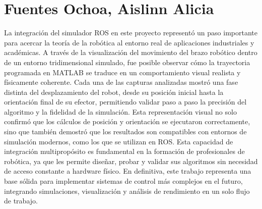 \section{Fuentes Ochoa, Aislinn Alicia}
La integración del simulador ROS en este proyecto representó un paso importante para acercar la teoría de la robótica al entorno real de aplicaciones industriales y académicas. A través de la visualización del movimiento del brazo robótico dentro de un entorno tridimensional simulado, fue posible observar cómo la trayectoria programada en MATLAB se traduce en un comportamiento visual realista y físicamente coherente. Cada una de las capturas analizadas mostró una fase distinta del desplazamiento del robot, desde su posición inicial hasta la orientación final de su efector, permitiendo validar paso a paso la precisión del algoritmo y la fidelidad de la simulación. Esta representación visual no solo confirmó que los cálculos de posición y orientación se ejecutaron correctamente, sino que también demostró que los resultados son compatibles con entornos de simulación modernos, como los que se utilizan en ROS. Esta capacidad de integración multipropósito es fundamental en la formación de profesionales de robótica, ya que les permite diseñar, probar y validar sus algoritmos sin necesidad de acceso constante a hardware físico. En definitiva, este trabajo representa una base sólida para implementar sistemas de control más complejos en el futuro, integrando simulaciones, visualización y análisis de rendimiento en un solo flujo de trabajo.